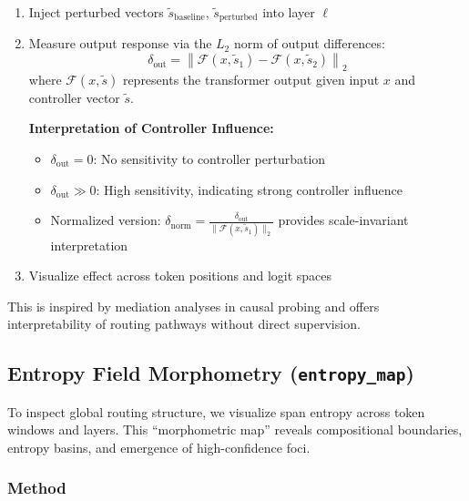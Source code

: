 \begin{enumerate}[leftmargin=1.5em]
  \item Inject perturbed vectors \( \tilde{s}_\text{baseline} \), \( \tilde{s}_\text{perturbed} \) into layer \( \ell \)
  \item Measure output response via the \(L_2\) norm of output differences:
  \begin{equation}
    \delta_{\text{out}} = \left\| \mathcal{F}(x, \tilde{s}_1) - \mathcal{F}(x, \tilde{s}_2) \right\|_2
    \label{eq:controller_effect}
  \end{equation}
  where \(\mathcal{F}(x, \tilde{s})\) represents the transformer output given input \(x\) and controller vector \(\tilde{s}\).
  
  \textbf{Interpretation of Controller Influence:}
  \begin{itemize}[leftmargin=1.5em]
  \item \(\delta_{\text{out}} = 0\): No sensitivity to controller perturbation
  \item \(\delta_{\text{out}} \gg 0\): High sensitivity, indicating strong controller influence
  \item Normalized version: \(\delta_{\text{norm}} = \frac{\delta_{\text{out}}}{\|\mathcal{F}(x, \tilde{s}_1)\|_2}\) provides scale-invariant interpretation
  \end{itemize}
  \item Visualize effect across token positions and logit spaces
\end{enumerate}

This is inspired by mediation analyses in causal probing \cite{vig2020investigating, belinkov2019analyzing} and offers interpretability of routing pathways without direct supervision.

\subsection{Entropy Field Morphometry (\texttt{entropy\_map})}
\label{sec:vis-entropy}

To inspect global routing structure, we visualize span entropy across token windows and layers. This “morphometric map” reveals compositional boundaries, entropy basins, and emergence of high-confidence foci.

\subsubsection*{Method}

